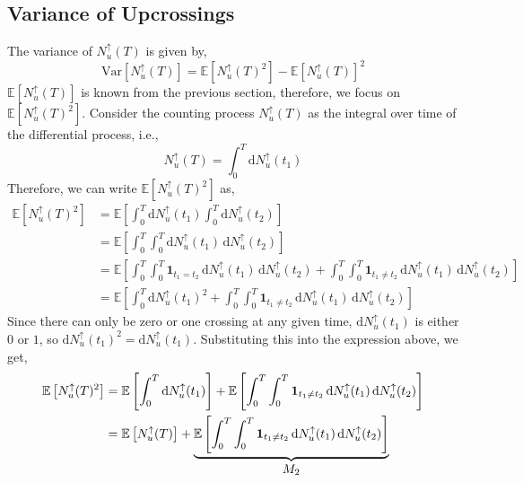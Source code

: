 \documentclass[journal]{IEEEtran}
\theoremstyle{plain}
\theoremstyle{definition}
\theoremstyle{remark}
\newcommand{\E}{\mathbb{E}}
\newcommand{\Nup}{N_u^{\uparrow}(T)}
\newcommand{\dd}{\mathrm{d}}
\newcommand{\Var}{\text{Var}}
\begin{document}
\subsection{Variance of Upcrossings} \label{section:variance_derivation1}
The variance of $\Nup$ is given by,
\begin{equation}
    \Var\left[\Nup\right] = \E\left[\Nup^2\right] - \E\left[\Nup\right]^2
\end{equation}
$\E\left[\Nup\right]$ is known from the previous section, therefore, we focus on $\E\left[\Nup^2\right]$. Consider the counting process $\Nup$ as the integral over time of the differential process, i.e., 
\begin{equation}
    \Nup = \int_0^T \dd N^\uparrow_u(t_1)
\end{equation}
Therefore, we can write $\E\left[\Nup^2\right]$ as,
\begin{equation}
\begin{split}
    \E\left[\Nup^2\right] &= \E\left[\int_0^T \dd {N^\uparrow_u}(t_1) \int_0^T \dd {N^\uparrow_u}(t_2)\right] \\
    &= \E\left[\int_0^T \int_0^T \dd {N^\uparrow_u}(t_1)  \, \dd {N^\uparrow_u}(t_2)\right] \\
    &= \E\left[\int_0^T \int_0^T \mathbf{1}_{t_1=t_2} \, \dd  {N^\uparrow_u}(t_1) \, \dd {N^\uparrow_u}(t_2) + \int_0^T \int_0^T \mathbf{1}_{t_1\neq t_2}  \,\dd  {N^\uparrow_u}(t_1) \, \dd {N^\uparrow_u}(t_2)\right] \\
    &= \E\left[\int_0^T \dd  {N^\uparrow_u}(t_1)^2 + \int_0^T \int_0^T \mathbf{1}_{t_1\neq t_2}  \, \dd {N^\uparrow_u}(t_1)  \, \dd {N^\uparrow_u}(t_2)\right]
\end{split}
\end{equation}
Since there can only be zero or one crossing at any given time, $\dd  {N^\uparrow_u}(t_1)$ is either $0$ or $1$, so $\dd  {N^\uparrow_u}(t_1)^2 = \dd  {N^\uparrow_u}(t_1)$. Substituting this into the expression above, we get,
\begin{equation}
\begin{split}
    \E\left[\Nup^2\right] &= \E\left[\int_0^T \dd  {N^\uparrow_u}(t_1)\right] + \E\left[\int_0^T \int_0^T \mathbf{1}_{t_1\neq t_2}  \,\dd {N^\uparrow_u}(t_1)  \, \dd {N^\uparrow_u}(t_2)\right] \\
    &= \E\left[\Nup\right] + \underbrace{\E\left[\int_0^T \int_0^T \mathbf{1}_{t_1\neq t_2}  \,\dd {N^\uparrow_u}(t_1)  \, \dd {N^\uparrow_u}(t_2)\right]}_{\text{\normalsize \(M_2\)}}
\end{split}
\end{equation}
\end{document}
